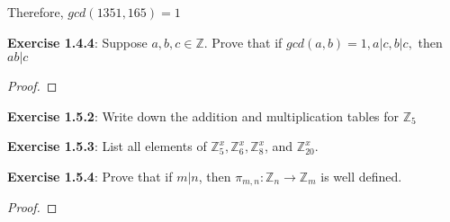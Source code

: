 \documentclass[a4paper]{article}
\begin{document}
\begin{myparindent}{0pt}
Therefore, $gcd(1351, 165) = 1$ \newline
\newline

\textbf{Exercise 1.4.4}:
Suppose $a, b, c \in \mathbb{Z}$. Prove that if $gcd(a, b) = 1, a|c, b|c,$ then $ab|c$
\begin{proof}
\end{proof}

\textbf{Exercise 1.5.2}:
Write down the addition and multiplication tables for $\mathbb{Z}_5$

\textbf{Exercise 1.5.3}:
List all elements of $\mathbb{Z}_5^x, \mathbb{Z}_6^x, \mathbb{Z}_8^x$, and $\mathbb{Z}_{20}^x$.

\textbf{Exercise 1.5.4}:
Prove that if $m|n$, then $\pi_{m, n}: \mathbb{Z}_n \rightarrow \mathbb{Z}_m$ is well defined.

\begin{proof}
\end{proof}

\end{myparindent}
\end{document}
